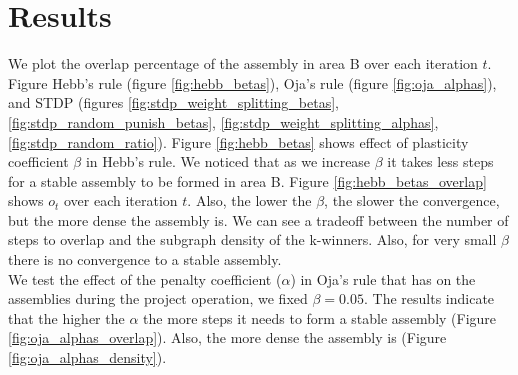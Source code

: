 \documentclass{article}
\begin{document}
\section{Results}

We plot the overlap percentage of the assembly in area B over each iteration $t$. Figure Hebb's rule (figure \ref{fig:hebb_betas}), Oja's rule (figure \ref{fig:oja_alphas}), and STDP (figures \ref{fig:stdp_weight_splitting_betas}, \ref{fig:stdp_random_punish_betas}, \ref{fig:stdp_weight_splitting_alphas}, \ref{fig:stdp_random_ratio}).
Figure \ref{fig:hebb_betas} shows effect of plasticity coefficient $\beta$ in Hebb's rule. We noticed that as we increase $\beta$ it takes less steps for a stable assembly to be formed in area B. Figure \ref{fig:hebb_betas_overlap} shows $o_t$ over each iteration $t$. Also, the lower the $\beta$, the slower the convergence, but the more dense the assembly is. We can see a tradeoff between the number of steps to overlap and the subgraph density of the k-winners. Also, for very small $\beta$ there is no convergence to a stable assembly.\\

We test the effect of the penalty coefficient ($\alpha$) in Oja's rule that has on the assemblies during the project operation, we fixed $\beta = 0.05$. The results indicate that the higher the $\alpha$ the more steps it needs to form a stable assembly (Figure \ref{fig:oja_alphas_overlap}). Also, the more dense the assembly is (Figure \ref{fig:oja_alphas_density}).
\end{document}
